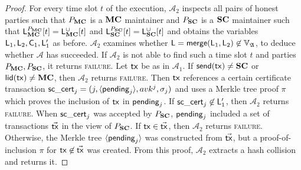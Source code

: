 \begin{proof}
  For every time slot $t$ of the execution, $\mathcal{A}_2$ inspects all pairs
  of honest parties such that $P_{\mathbf{MC}}$ is a $\mathbf{MC}$ maintainer and $P_{\mathbf{SC}}$ is
  a $\mathbf{SC}$ maintainer such that
  $\mathsf{L}_{\mathbf{MC}}^{P_{\mathbf{MC}}}[t] = \mathsf{L}_{\mathbf{MC}}^\cup[t]$ and
  $\mathsf{L}_{\mathbf{SC}}^{P_{\mathbf{SC}}}[t] = \mathsf{L}_{\mathbf{SC}}^\cup[t]$
  and obtains the variables $\mathsf{L}_1, \mathsf{L}_2, \mathsf{C}_1,
  \mathsf{L}'_1$ as before. $\mathcal{A}_2$ examines whether $\mathsf{L} =
  \mathsf{merge}(\mathsf{L}_1, \mathsf{L}_2) \not\in\mathbb{V}_{\mathfrak{A}}$, to deduce whether $\mathcal{A}$
  has succeeded. If $\mathcal{A}_2$ is not able to find such a time slot $t$ and
  parties $P_{\mathbf{MC}}, P_{\mathbf{SC}}$, it returns \textsc{failure}. Let $\mathsf{tx}$ be as in
  $\mathcal{A}_1$. If $\mathsf{send}(\mathsf{tx}) \neq \mathbf{SC}$ or $\mathsf{lid}(\mathsf{tx}) \neq \mathbf{MC}$, then
  $\mathcal{A}_2$ returns \textsc{failure}. Then $\mathsf{tx}$ references a certain
  certificate transaction $\mathsf{sc\_cert}_j = (j,\langle\mathsf{pending}_j\rangle, avk^j,\sigma_j)$ and
  uses a Merkle tree proof $\pi$ which proves the inclusion of $\mathsf{tx}$ in
  $\mathsf{pending}_j$. If $\mathsf{sc\_cert}_j \not\in \mathsf{L}'_1$,
  then $\mathcal{A}_2$ returns
  \textsc{failure}. When $\mathsf{sc\_cert}_j$ was accepted by $P_{\mathbf{SC}}$, $\mathsf{pending}_j$
  included a set of transactions $\vec{\mathsf{tx}}$ in the view of $P_{\mathbf{SC}}$. If $\mathsf{tx}
  \in \vec{\mathsf{tx}}$, then $\mathcal{A}_2$ returns \textsc{failure}. Otherwise, the
  Merkle tree $\langle\mathsf{pending}_j\rangle$ was constructed from $\vec{\mathsf{tx}}$, but a
  proof-of-inclusion $\pi$ for $\mathsf{tx} \not\in \vec{\mathsf{tx}}$ was created. From this
  proof, $\mathcal{A}_2$ extracts a hash collision and returns it.


\end{proof}
